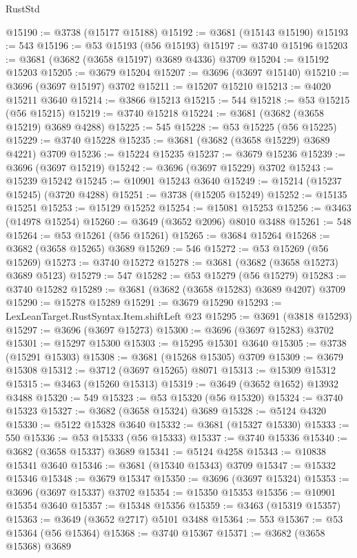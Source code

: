 \begin{lexlean}{RustStd}
\begin{coremodule}
@15190 := @3738 (@15177 @15188)
@15192 := @3681 (@15143 @15190)
@15193 := 543
@15196 := @53 @15193 (@56 @15193)
@15197 := @3740 @15196
@15203 := @3681 (@3682 (@3658 @15197) @3689 @4336) @3709
@15204 := @15192 @15203
@15205 := @3679 @15204
@15207 := @3696 (@3697 @15140)
@15210 := @3696 (@3697 @15197) @3702
@15211 := @15207 @15210
@15213 := @4020 @15211 @3640
@15214 := @3866 @15213
@15215 := 544
@15218 := @53 @15215 (@56 @15215)
@15219 := @3740 @15218
@15224 := @3681 (@3682 (@3658 @15219) @3689 @4288)
@15225 := 545
@15228 := @53 @15225 (@56 @15225)
@15229 := @3740 @15228
@15235 := @3681 (@3682 (@3658 @15229) @3689 @4221) @3709
@15236 := @15224 @15235
@15237 := @3679 @15236
@15239 := @3696 (@3697 @15219)
@15242 := @3696 (@3697 @15229) @3702
@15243 := @15239 @15242
@15245 := @10901 @15243 @3640
@15249 := @15214 (@15237 @15245) (@3720 @4288)
@15251 := @3738 (@15205 @15249)
@15252 := @15135 @15251
@15253 := @15129 @15252
@15254 := @15081 @15253
@15256 := @3463 (@14978 @15254)
@15260 := @3649 (@3652 @2096) @8010 @3488
@15261 := 548
@15264 := @53 @15261 (@56 @15261)
@15265 := @3684 @15264
@15268 := @3682 (@3658 @15265) @3689
@15269 := 546
@15272 := @53 @15269 (@56 @15269)
@15273 := @3740 @15272
@15278 := @3681 (@3682 (@3658 @15273) @3689 @5123)
@15279 := 547
@15282 := @53 @15279 (@56 @15279)
@15283 := @3740 @15282
@15289 := @3681 (@3682 (@3658 @15283) @3689 @4207) @3709
@15290 := @15278 @15289
@15291 := @3679 @15290
@15293 := LexLeanTarget.RustSyntax.Item.shiftLeft @23
@15295 := @3691 (@3818 @15293)
@15297 := @3696 (@3697 @15273)
@15300 := @3696 (@3697 @15283) @3702
@15301 := @15297 @15300
@15303 := @15295 @15301 @3640
@15305 := @3738 (@15291 @15303)
@15308 := @3681 (@15268 @15305) @3709
@15309 := @3679 @15308
@15312 := @3712 (@3697 @15265) @8071
@15313 := @15309 @15312
@15315 := @3463 (@15260 @15313)
@15319 := @3649 (@3652 @1652) @13932 @3488
@15320 := 549
@15323 := @53 @15320 (@56 @15320)
@15324 := @3740 @15323
@15327 := @3682 (@3658 @15324) @3689
@15328 := @5124 @4320
@15330 := @5122 @15328 @3640
@15332 := @3681 (@15327 @15330)
@15333 := 550
@15336 := @53 @15333 (@56 @15333)
@15337 := @3740 @15336
@15340 := @3682 (@3658 @15337) @3689
@15341 := @5124 @4258
@15343 := @10838 @15341 @3640
@15346 := @3681 (@15340 @15343) @3709
@15347 := @15332 @15346
@15348 := @3679 @15347
@15350 := @3696 (@3697 @15324)
@15353 := @3696 (@3697 @15337) @3702
@15354 := @15350 @15353
@15356 := @10901 @15354 @3640
@15357 := @15348 @15356
@15359 := @3463 (@15319 @15357)
@15363 := @3649 (@3652 @2717) @5101 @3488
@15364 := 553
@15367 := @53 @15364 (@56 @15364)
@15368 := @3740 @15367
@15371 := @3682 (@3658 @15368) @3689

\end{coremodule}
\end{lexlean}
